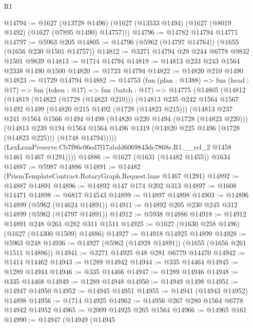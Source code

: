 \begin{lexlean}{R1}
\begin{coremodule}
@14794 := @1627
    (@13728 @1496)
    (@1627 (@13533 @1494) (@1627 (@8019 @1492) (@1627 (@7895 @1490) @14757)))
@14796 := @14782 @14794 @14771
@14797 := @5963 @205
@14805 := @14796 (@5962 (@14797 @14764)) (@1655 (@1656 @230 @1501 @14757))
@14812 := @3271 @14794 @29 @244 @6778 @9832 @1501 @9839
@14813 := @1714 @14794
@14819 := @14813 @233 @243 @1564 @2338 @1490 @1500
@14820 := @1723 @14794
@14822 := @14820 @210 @1490
@14823 := @1729 @14794
@14882 := @14753
    (fun (plan : @1388) =>
    fun (head : @17) =>
    fun (token : @17) =>
    fun (batch : @17) =>
    @14775
      (@14805
        (@14812
          (@14819
            (@14822 (@1728 (@14823 @210)))
            (@14813
              @235
              @242
              @1564
              @1567
              @1492
              @1499
              (@14820 @215 @1492 (@1728 (@14823 @215)))
              (@14813
                @237
                @241
                @1564
                @1566
                @1494
                @1498
                (@14820 @220 @1494 (@1728 (@14823 @220)))
                (@14813
                  @239
                  @194
                  @1564
                  @1564
                  @1496
                  @1319
                  (@14820 @225 @1496 (@1728 (@14823 @225)))
                  (@1748 @14794)))))
          (LexLeanPreserve.Cb7f86c06ed7f17abdd6069843de7868e.R1.__rel_2 @1458 @1461 @1467 @1291))))
@14886 := @1627 (@1631 (@14482 @1455)) @1634
@14887 := @5987 @14886
@14891 := @14482 (PrismTemplateContract.RotaryGraph.Request.lane @1467 @1291)
@14892 := @14887 @14891
@14896 := @14892 @147 @174 @202 @313
@14897 := @1608 @14471
@14898 := @6817 @14543
@14899 := @14897 @14898
@14903 := @14896 @14899 (@5962 (@14624 @14891))
@14911 := @14892 @205 @230 @245 @312 @14899 (@5962 (@14797 @14891))
@14912 := @5938 @14886
@14918 := @14912 @14891 @248 @261 @282 @311 @1511
@14925 := @1627 (@1630 @258 @1496) (@1627 (@14300 @1509) @14886)
@14927 := @14918 @14925 @14899
@14928 := @5963 @248
@14936 := @14927 (@5962 (@14928 @14891)) (@1655 (@1656 @261 @1511 @14886))
@14941 := @3271 @14925 @48 @281 @6779 @14470
@14942 := @1414 @14462
@14943 := @1289 @14942
@14944 := @335 @14464
@14945 := @1289 @14944
@14946 := @335 @14466
@14947 := @1289 @14946
@14948 := @335 @14468
@14949 := @1289 @14948
@14950 := @14949 @1498
@14951 := @14947 @14950
@14952 := @14945 @14951
@14955 := @14941 (@14943 @14952) @14898
@14956 := @1714 @14925
@14962 := @14956 @267 @280 @1564 @6778 @14942 @14952
@14965 := @2009 @14925 @265 @1564
@14966 := @14965 @161
@14990 := @14947
    (@14949
      (@14945

\end{coremodule}
\end{lexlean}
